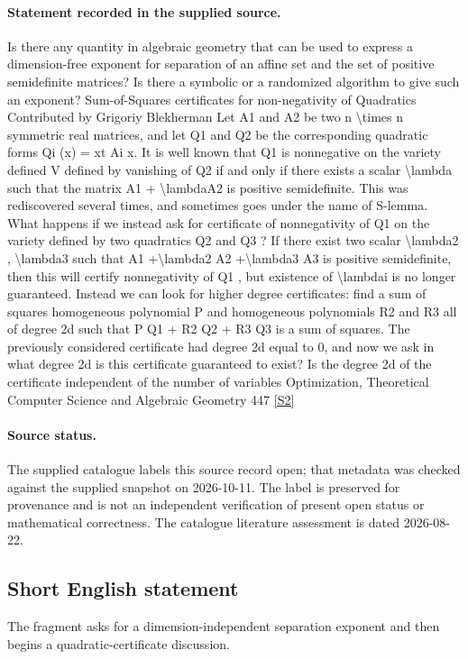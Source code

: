 \documentclass[11pt]{article}
\newcommand{\sref}[2]{\hyperlink{source:#1:#2}{[S#2]}}
\begin{document}
\paragraph{Statement recorded in the supplied source.}
Is there any quantity in algebraic geometry that can be used to express a dimension-free exponent for separation of an aﬃne set and the set of positive semideﬁnite matrices? Is there a symbolic or a randomized algorithm to give such an exponent? Sum-of-Squares certificates for non-negativity of Quadratics Contributed by Grigoriy Blekherman Let A1 and A2 be two n \textbackslash{}times n symmetric real matrices, and let Q1 and Q2 be the corresponding quadratic forms Qi (x) = xt Ai x. It is well known that Q1 is nonnegative on the variety deﬁned V deﬁned by vanishing of Q2 if and only if there exists a scalar \textbackslash{}lambda such that the matrix A1 + \textbackslash{}lambdaA2 is positive semideﬁnite. This was rediscovered several times, and sometimes goes under the name of S-lemma. What happens if we instead ask for certiﬁcate of nonnegativity of Q1 on the variety deﬁned by two quadratics Q2 and Q3 ? If there exist two scalar \textbackslash{}lambda2 , \textbackslash{}lambda3 such that A1 +\textbackslash{}lambda2 A2 +\textbackslash{}lambda3 A3 is positive semideﬁnite, then this will certify nonnegativity of Q1 , but existence of \textbackslash{}lambdai is no longer guaranteed. Instead we can look for higher degree certificates: ﬁnd a sum of squares homogeneous polynomial P and homogeneous polynomials R2 and R3 all of degree 2d such that P Q1 + R2 Q2 + R3 Q3 is a sum of squares. The previously considered certiﬁcate had degree 2d equal to 0, and now we ask in what degree 2d is this certiﬁcate guaranteed to exist? Is the degree 2d of the certiﬁcate independent of the number of variables Optimization, Theoretical Computer Science and Algebraic Geometry 447 \sref{30006213}{2}
\paragraph{Source status.}
The supplied catalogue labels this source record open; that metadata was checked against the supplied snapshot on 2026-10-11. The label is preserved for provenance and is not an independent verification of present open status or mathematical correctness. The catalogue literature assessment is dated 2026-08-22.
\subsection{Short English statement}
The fragment asks for a dimension-independent separation exponent and then begins a quadratic-certificate discussion.
\end{document}
